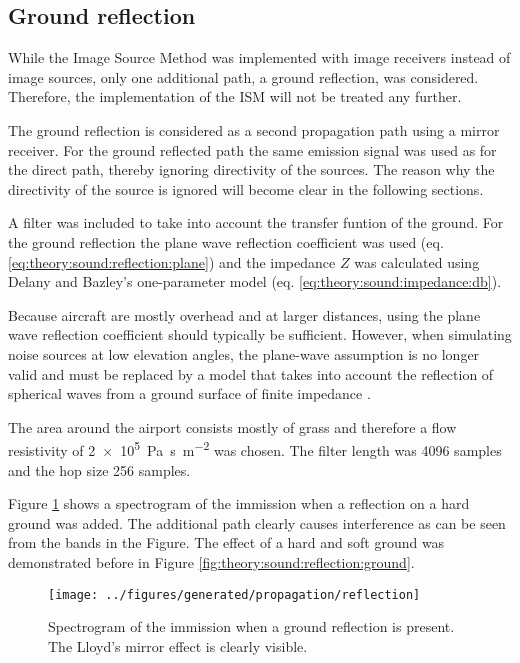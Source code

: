 \newpage
\subsection{Ground reflection} %
While the Image Source Method was implemented with image
receivers instead of image sources, only one additional path,
a ground reflection, was considered. Therefore, the implementation of the ISM
will not be treated any further.

The ground reflection is considered as a second propagation path using a mirror receiver.
For the ground reflected path the same emission signal was used as for the
direct path, thereby ignoring directivity of the sources. The reason why the directivity of
the source is ignored will become clear in the following sections.

A filter was included to take into account the transfer funtion of the ground.
For the ground reflection the plane wave reflection coefficient was used (eq. \eqref{eq:theory:sound:reflection:plane}) and the impedance $Z$ was
calculated using Delany and Bazley's one-parameter model (eq. \eqref{eq:theory:sound:impedance:db}).

Because aircraft are mostly overhead and at larger distances,
using the plane wave reflection coefficient should typically be sufficient.
However, when simulating noise sources at low elevation angles, the plane-wave
assumption is no longer valid and must be replaced by a model that takes into
account the reflection of spherical waves from a ground surface of finite
impedance \cite{Tuttle2014}. %

The area around the airport consists mostly of grass and therefore a flow resistivity of
\SI{2e5}{\pascal\second\per\meter\squared} was chosen. The filter length was
4096 samples and the hop size 256 samples.

Figure \ref{fig:implementation:propagation:reflection} shows a spectrogram of
the immission when a reflection on a hard ground was added. The additional path
clearly causes interference as can be seen from the bands in the Figure.
The effect of a hard and soft ground was demonstrated before in Figure \ref{fig:theory:sound:reflection:ground}.

\begin{figure}[H]
  \centering
  \texttt{[image: ../figures/generated/propagation/reflection]}
  \caption{Spectrogram of the immission when a ground reflection is present. The Lloyd's mirror effect is clearly visible.}
  \label{fig:implementation:propagation:reflection}
\end{figure} %

